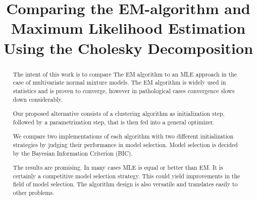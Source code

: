 \documentclass[11pt,a4paper,twoside,openright]{report}
\theoremstyle{definition}
\numberwithin{equation}{subsection}
\begin{document}


 \alternatereaderprefix{}
 \alternatereader{}
 \title{Comparing the EM-algorithm and Maximum Likelihood Estimation Using the 
        Cholesky Decomposition} %

 \maketitle%

 \newpage
\begin{abstract}
	The intent of this work is to compare The EM algorithm to an MLE approach in 
    the	case of multivariate normal mixture models. 
	The EM algorithm is widely used in statistics and is proven to converge, 
	however in pathological cases convergence slows down considerably. 

    Our proposed alternative consists of a clustering algorithm as 
    initialization step, followed by a parametrization step, that is then fed 
    into a general optimizer.

    We compare two implementations of each algorithm with two different 
    initialization strategies by judging their performance in model selection.
    Model selection is decided by the Bayesian Information Criterion (BIC).

    The results are promising. In many cases MLE is equal or better than EM.
    It is certainly a competitive model selection strategy. This could yield
    improvements in the field of model selection. The algorithm design is also 
    versatile and translates easily to other problems.
\end{abstract}
\end{document}
